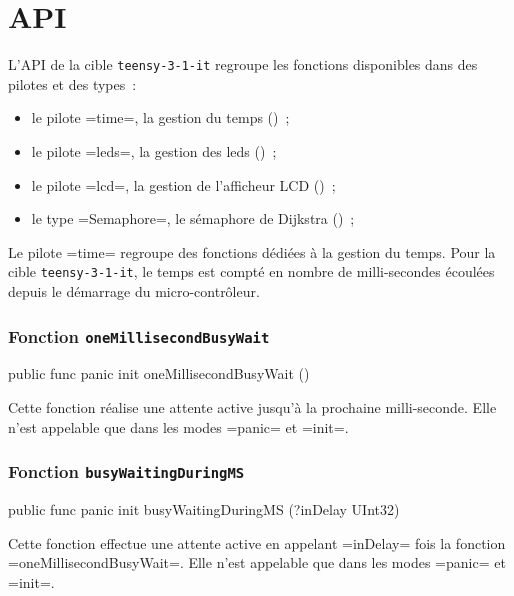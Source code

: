 \section{API}

L'API de la cible \texttt{teensy-3-1-it} regroupe les fonctions disponibles dans des pilotes et des types~:
\begin{itemize}
  \item le pilote \omnibus=time=, la gestion du temps ()~;
  \item le pilote \omnibus=leds=, la gestion des leds ()~;
  \item le pilote \omnibus=lcd=, la gestion de l'afficheur LCD ()~;
  \item le type \omnibus=Semaphore=, le sémaphore de Dijkstra ()~;
\end{itemize}


Le pilote \omnibus=time= regroupe des fonctions dédiées à la gestion du temps. Pour la cible \texttt{teensy-3-1-it}, le temps est compté en nombre de milli-secondes écoulées depuis le démarrage du micro-contrôleur.

\subsubsection{Fonction \texttt{oneMillisecondBusyWait}}


\begin{OMNIBUS}
  public func panic init oneMillisecondBusyWait ()
\end{OMNIBUS}

Cette fonction réalise une attente active jusqu'à la prochaine milli-seconde. Elle n'est appelable que dans les modes \omnibus=panic= et \omnibus=init=.





\subsubsection{Fonction \texttt{busyWaitingDuringMS}}

\begin{OMNIBUS}
  public func panic init busyWaitingDuringMS (?inDelay UInt32)
\end{OMNIBUS}

Cette fonction effectue une attente active en appelant \omnibus=inDelay= fois la fonction \omnibus=oneMillisecondBusyWait=. Elle n'est appelable que dans les modes \omnibus=panic= et \omnibus=init=.





